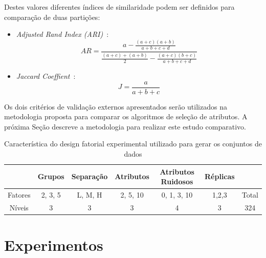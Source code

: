 \documentclass{acm_proc_article-sp}
\begin{document}
Destes valores diferentes índices de similaridade podem ser definidos para comparação de duas partições:
\begin{itemize}
    \item \textit{Adjusted Rand Index (ARI)}~\cite{hubert1985comparing,jain1988algorithms}:
$$ AR = \frac{a - \frac{(a+c)(a+b)}{a+b+c+d}}{\frac{(a+c)+(a+b)}{2} - \frac{(a+c)(b+c)}{a+b+c+d}} $$

    \item \textit{Jaccard Coeffient}~\cite{jain1988algorithms,kaufman2009finding}:
$$ J = \frac{a}{a+b+c} $$
\end{itemize}

Os dois critérios de validação externos apresentados serão utilizados na metodologia proposta para comparar os algoritmos de seleção de atributos.
A próxima Seção descreve a metodologia para realizar este estudo comparativo.

\begin{table}
    \centering
    \begin{tabular}{ccccccc}
        \toprule
        & Grupos & Separação & Atributos & \multicolumn{1}{p{1.5cm}}{Atributos Ruidosos} & Réplicas\\
        \midrule
        Fatores & 2, 3, 5   & L, M, H   & 2, 5, 10  & 0, 1, 3, 10   & 1,2,3     & Total\\
        \midrule
        Níveis & 3          & 3         & 3         & 4             & 3         & 324\\
        \bottomrule
    \end{tabular}
    \caption{Característica do design fatorial experimental utilizado para gerar os conjuntos de dados}
    \label{tab:datasets}
\end{table}

\section{Experimentos}
\label{sec:experiments}
\end{document}
